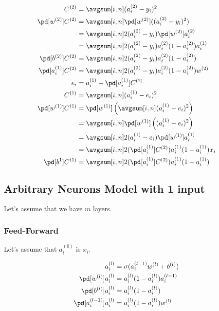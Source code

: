 \documentclass{article}
\begin{document}
\begin{align}
	C^{(2)} &= \avgsum[i, n] (a_i^{(2)} - y_i)^2 \\
	\pd[w^{(2)}] C^{(2)}
	&= \avgsum[i, n] \pd[w^{(2)}]((a_i^{(2)} - y_i)^2)  \\
	&= \avgsum[i, n] 2(a_i^{(2)} - y_i)\pd[w^{(2)}]a_i^{(2)}  \\
	&= \avgsum[i, n] 2(a_i^{(2)} - y_i)a_i^{(2)}(1 - a_i^{(2)})a_i^{(1)} \\
	\pd[b^{(2)}] C^{(2)} &= \avgsum[i, n] 2(a_i^{(2)} - y_i)a_i^{(2)}(1 - a_i^{(2)}) \\
	\pd[a_i^{(1)}]C^{(2)} &= \avgsum[i, n] 2(a_i^{(2)} - y_i)a_i^{(2)}(1 - a_i^{(2)})w^{(2)} \\
	e_i &= a_i^{(1)} - \pd[a_i^{(1)}]C^{(2)} \\
	C^{(1)} &= \avgsum[i, n] (a_i^{(1)} - e_i)^2 \\
	\pd[w^{(1)}]C^{(1)}
	&= \pd[w^{(1)}]\left(\avgsum[i, n] (a_i^{(1)} - e_i)^2\right) \\
	&= \avgsum[i, n] \pd[w^{(1)}]\left((a_i^{(1)} - e_i)^2\right) \\
	&= \avgsum[i, n] 2(a_i^{(1)} - e_i)\pd[w^{(1)}]a_i^{(1)} \\
	&= \avgsum[i, n] 2(\pd[a_i^{(1)}]C^{(2)})a_i^{(1)}(1 - a_i^{(1)})x_i \\
	\pd[b^{1}]C^{(1)} &= \avgsum[i, n] 2(\pd[a_i^{(1)}]C^{(2)})a_i^{(1)}(1 - a_i^{(1)})
\end{align}

\subsection{Arbitrary Neurons Model with 1 input}

Let's assume that we have $m$ layers.

\subsubsection{Feed-Forward}

Let's assume that $a_i^{(0)}$ is $x_i$.

\begin{align}
	a_i^{(l)} &= \sigma(a_i^{(l-1)}w^{(l)} + b^{(l)}) \\
	\pd[w^{(l)}]a_i^{(l)} &= a_i^{(l)}(1 - a_i^{(l)})a_i^{(l-1)} \\
	\pd[b^{(l)}]a_i^{(l)} &= a_i^{(l)}(1 - a_i^{(l)}) \\
	\pd[a_i^{(l-1)}]a_i^{(l)} &= a_i^{(l)}(1 - a_i^{(l)})w^{(l)}
\end{align}
\end{document}
